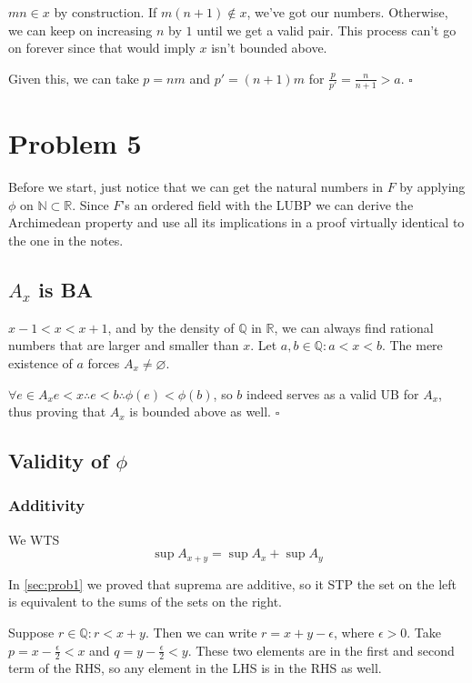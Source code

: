 \documentclass[12pt]{article}
\newcommand{\R}{\mathbb{R}}
\newcommand{\Q}{\mathbb{Q}}
\begin{document}
$mn \in x$ by construction.
If $m(n+1) \notin x$, we've got our numbers.
Otherwise, we can keep on increasing $n$ by $1$ until we get a valid pair.
This process can't go on forever since that would imply $x$ isn't bounded above.

Given this, we can take $p=nm$ and $p'=(n+1)m$ for $\frac{p}{p'}=\frac{n}{n+1}>a$. $\square$

\pagebreak

\section{Problem 5}

Before we start, just notice that we can get the natural numbers in
$F$ by applying $\phi$ on $\mathbb{N} \subset \R$.
Since $F$'s an ordered field with the LUBP we can derive the Archimedean
property and use all its implications in a proof virtually identical to the one in the notes.

\subsection{\texorpdfstring{$A_x$}{Ax} is BA}

$x-1 < x < x+1$, and by the density of $\Q$ in $\R$,
we can always find rational numbers that are larger and smaller than $x$.
Let $a, b \in \Q: a < x < b$.
The mere existence of $a$ forces $A_x \ne \varnothing$.

$\forall e \in A_x e < x \therefore e < b \therefore \phi(e) < \phi(b)$,
so $b$ indeed serves as a valid UB for $A_x$, thus proving that $A_x$
is bounded above as well. $\square$

\subsection{Validity of \texorpdfstring{$\phi$}{Phi}}

\subsubsection{Additivity} \label{sec:additivity}

We WTS
\[\sup A_{x+y}=\sup A_x + \sup A_y\]

In \ref{sec:prob1} we proved that suprema are additive, so it STP
the set on the left is equivalent to the sums of the sets on the right.

Suppose $r \in \Q: r < x+y$.
Then we can write $r=x+y-\epsilon$, where $\epsilon > 0$.
Take $p=x-\frac{\epsilon}{2}<x$ and $q=y-\frac{\epsilon}{2}<y$.
These two elements are in the first and second term of the RHS,
so any element in the LHS is in the RHS  as well.
\end{document}
